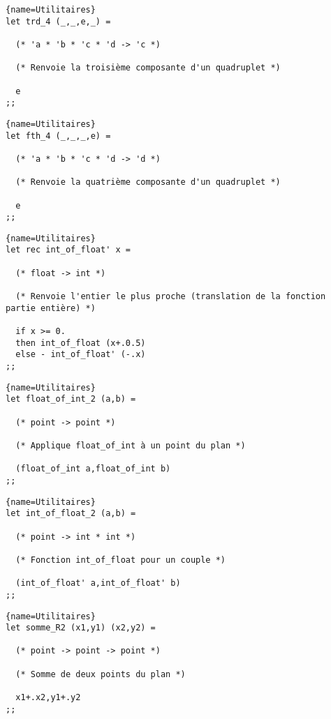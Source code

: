 \documentclass[10pt,twoside,a4paper]{article}
\begin{document}
\begin{lstlisting}{name=Utilitaires}
let trd_4 (_,_,e,_) =

  (* 'a * 'b * 'c * 'd -> 'c *)

  (* Renvoie la troisième composante d'un quadruplet *)
  
  e
;;
\end{lstlisting}
\pagebreak
\begin{lstlisting}{name=Utilitaires}
let fth_4 (_,_,_,e) =
  
  (* 'a * 'b * 'c * 'd -> 'd *)

  (* Renvoie la quatrième composante d'un quadruplet *)
  
  e
;;
\end{lstlisting}

\begin{lstlisting}{name=Utilitaires}
let rec int_of_float' x =

  (* float -> int *)

  (* Renvoie l'entier le plus proche (translation de la fonction partie entière) *)

  if x >= 0.
  then int_of_float (x+.0.5)
  else - int_of_float' (-.x)
;;
\end{lstlisting}

\begin{lstlisting}{name=Utilitaires}
let float_of_int_2 (a,b) =

  (* point -> point *)

  (* Applique float_of_int à un point du plan *)
  
  (float_of_int a,float_of_int b)
;;
\end{lstlisting}

\begin{lstlisting}{name=Utilitaires}
let int_of_float_2 (a,b) =

  (* point -> int * int *)

  (* Fonction int_of_float pour un couple *)
  
  (int_of_float' a,int_of_float' b)
;;
\end{lstlisting}

\begin{lstlisting}{name=Utilitaires}
let somme_R2 (x1,y1) (x2,y2) =

  (* point -> point -> point *)

  (* Somme de deux points du plan *)
  
  x1+.x2,y1+.y2
;;
\end{lstlisting}
\end{document}

